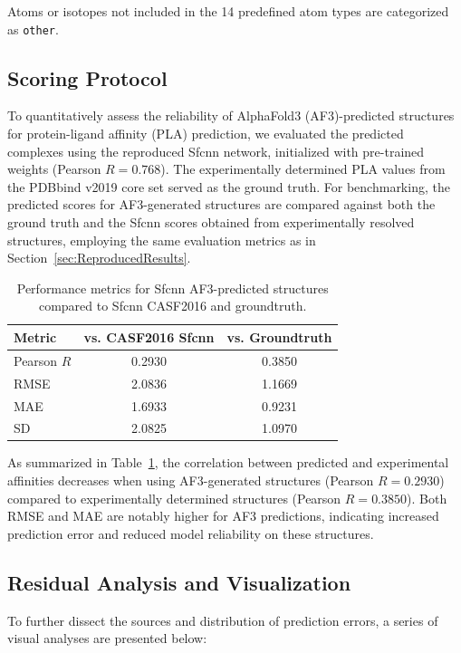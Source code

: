 \documentclass[unnumsec,webpdf,contemporary,large]{oup-authoring-template}
\theoremstyle{thmstyleone}%
\theoremstyle{thmstyletwo}%
\theoremstyle{thmstylethree}%
\begin{document}
Atoms or isotopes not included in the 14 predefined atom types are categorized as \texttt{other}.

\subsection{Scoring Protocol}
To quantitatively assess the reliability of AlphaFold3 (AF3)-predicted structures 
for protein-ligand affinity (PLA) prediction, we evaluated the predicted complexes 
using the reproduced Sfcnn network, initialized with pre-trained weights 
(Pearson $R = 0.768$). The experimentally determined PLA values from the PDBbind 
v2019 core set served as the ground truth. 
For benchmarking, the predicted scores for AF3-generated structures are compared 
against both the ground truth and the Sfcnn scores obtained from experimentally 
resolved structures, employing the same evaluation metrics as 
in Section~\ref{sec:ReproducedResults}.

\begin{table}[H]
\centering
\caption{Performance metrics for Sfcnn AF3-predicted structures compared to Sfcnn CASF2016 and groundtruth.}
\label{tab:af3_metrics}
\begin{tabular}{lcc}
\toprule
Metric & vs. CASF2016 Sfcnn & vs. Groundtruth \\
\midrule
Pearson $R$ & 0.2930 & 0.3850 \\
RMSE        & 2.0836 & 1.1669 \\
MAE         & 1.6933 & 0.9231 \\
SD          & 2.0825 & 1.0970 \\
\bottomrule
\end{tabular}
\end{table}

As summarized in Table~\ref{tab:af3_metrics}, 
the correlation between predicted and experimental 
affinities decreases when using AF3-generated structures
 (Pearson $R = 0.2930$) compared to experimentally 
 determined structures (Pearson $R = 0.3850$). 
 Both RMSE and MAE are notably higher for AF3 predictions, 
 indicating increased prediction error and reduced model 
 reliability on these structures.

\subsection{Residual Analysis and Visualization}
To further dissect the sources and distribution of prediction errors, 
a series of visual analyses are presented below:
\end{document}
